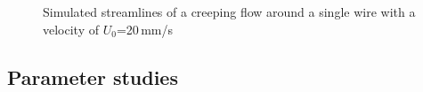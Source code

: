   \begin{figure}[H]
\centering

\caption[Simulated Stokes flow around cylinder]{Simulated streamlines of a creeping flow around a single wire with a velocity of $U_{0}$=20\,mm/s 
\label{fig:creep_flow_sw}
}
\end{figure}

\subsection{Parameter studies}
\label{subsec:Param_res}

